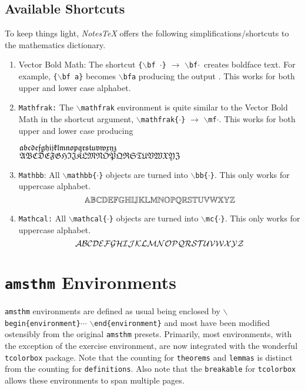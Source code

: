 \documentclass[10pt]{article}
\begin{document}
	\subsection{Available Shortcuts}
	To keep things light, \textit{NotesTeX} offers the following simplifications/shortcuts to the mathematics dictionary.
	\begin{enumerate}
		\item Vector Bold Math: The shortcut \texttt{\{$\backslash$bf $\cdot$\}} $\longrightarrow$ \texttt{$\backslash$bf$\cdot$}\ creates boldface text. For example, \texttt{\{$\backslash$bf a\}} becomes \texttt{$\backslash$bfa} producing the output \bfa. This works for both upper and lower case alphabet.
		\item \texttt{Mathfrak:} The \texttt{$\backslash$mathfrak} environment is quite similar to the Vector Bold Math in the shortcut argument, \texttt{$\backslash$mathfrak\{$\cdot$\}} $\longrightarrow$ \texttt{$\backslash$mf$\cdot$}. This works for both upper and lower case producing
		\begin{center}
			${\mathfrak{a}}{\mathfrak{b}}{\mathfrak{c}}{\mathfrak{d}}{\mathfrak{e}}{\mathfrak{f}}{\mathfrak{g}}{\mathfrak{h}}{\mathfrak{i}}{\mathfrak{j}}{\mathfrak{k}}{\mathfrak{l}}{\mathfrak{m}}{\mathfrak{n}}{\mathfrak{o}}{\mathfrak{p}}{\mathfrak{q}}{\mathfrak{r}}{\mathfrak{s}}{\mathfrak{t}}{\mathfrak{u}}{\mathfrak{v}}{\mathfrak{w}}{\mathfrak{x}}{\mathfrak{y}}{\mathfrak{z}}$\\
			${\mathfrak{A}}{\mathfrak{B}}{\mathfrak{C}}{\mathfrak{D}}{\mathfrak{E}}{\mathfrak{F}}{\mathfrak{G}}{\mathfrak{H}}{\mathfrak{I}}{\mathfrak{J}}{\mathfrak{K}}{\mathfrak{L}}{\mathfrak{M}}{\mathfrak{N}}{\mathfrak{O}}{\mathfrak{P}}{\mathfrak{Q}}{\mathfrak{R}}{\mathfrak{S}}{\mathfrak{T}}{\mathfrak{U}}{\mathfrak{V}}{\mathfrak{W}}{\mathfrak{X}}{\mathfrak{Y}}{\mathfrak{Z}}$
		\end{center}
		\item \texttt{Mathbb}: All \texttt{$\backslash$mathbb\{$\cdot$\}} objects are turned into \texttt{$\backslash$bb\{$\cdot$\}}. This only works for uppercase alphabet.
		\begin{equation*}
			{\mathbb{A}}{\mathbb{B}}{\mathbb{C}}{\mathbb{D}}{\mathbb{E}}{\mathbb{F}}{\mathbb{G}}{\mathbb{H}}{\mathbb{I}}{\mathbb{J}}{\mathbb{K}}{\mathbb{L}}{\mathbb{M}}{\mathbb{N}}{\mathbb{O}}{\mathbb{P}}{\mathbb{Q}}{\mathbb{R}}{\mathbb{S}}{\mathbb{T}}{\mathbb{U}}{\mathbb{V}}{\mathbb{W}}{\mathbb{X}}{\mathbb{Y}}{\mathbb{Z}}
		\end{equation*}
		\item \texttt{Mathcal:} All \texttt{$\backslash$mathcal\{$\cdot$\}} objects are turned into \texttt{$\backslash$mc\{$\cdot$\}}. This only works for uppercase alphabet.
		\begin{equation*}
			{\mathcal{A}}{\mathcal{B}}{\mathcal{C}}{\mathcal{D}}{\mathcal{E}}{\mathcal{F}}{\mathcal{G}}{\mathcal{H}}{\mathcal{I}}{\mathcal{J}}{\mathcal{K}}{\mathcal{L}}{\mathcal{M}}{\mathcal{N}}{\mathcal{O}}{\mathcal{P}}{\mathcal{Q}}{\mathcal{R}}{\mathcal{S}}{\mathcal{T}}{\mathcal{U}}{\mathcal{V}}{\mathcal{W}}{\mathcal{X}}{\mathcal{Y}}{\mathcal{Z}}
		\end{equation*}
	\end{enumerate}


	\newpage
	\section{\texttt{amsthm} Environments}\label{Sub:Special}
	\texttt{amsthm} environments are defined as usual being enclosed by \texttt{$\backslash$begin\{environment\}}$\cdots$ \texttt{$\backslash$end\{environment\}} and most have been modified ostensibly from the original \texttt{amsthm} presets. Primarily, most environments, with the exception of the exercise environment, are now integrated with the wonderful \texttt{tcolorbox} package. Note that the counting for \texttt{theorems} and \texttt{lemmas} is distinct from the counting for \texttt{definitions}. Also note that the \texttt{breakable} for \texttt{tcolorbox} allows these environments to span multiple pages.
\end{document}
